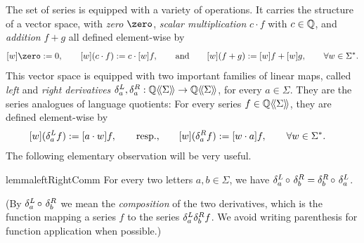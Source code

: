 The set of series is equipped with a variety of operations.
%
It carries the structure of a vector space,
with \emph{zero} $\zero$,
\emph{scalar multiplication} $c \cdot f$ with $c \in \mathbb Q$,
and \emph{addition} $f + g$ all defined element-wise by
%
\begin{align*}
    \coefficient w \zero := 0, \qquad
    \coefficient w {(c \cdot f)} := c \cdot \coefficient w f, \qquad \text{and} \qquad
    \coefficient w {(f + g)} := \coefficient w f + \coefficient w g,
    \qquad \forall w \in \Sigma^*.
\end{align*}
%
This vector space is equipped with two important families of linear maps,
called \emph{left} and \emph{right derivatives}
$\delta^L_{a}, \delta^R_{a} : \mathbb Q\langle\!\langle\Sigma\rangle\!\rangle \to \mathbb Q\langle\!\langle\Sigma\rangle\!\rangle$,
for every $a \in \Sigma$.
%
They are the series analogues of language quotients:
%
For every series $f \in \mathbb Q\langle\!\langle\Sigma\rangle\!\rangle$,
they are defined element-wise by
%
\begin{align*}
    [w](\delta^L_{a} f)
        &:= [a \cdot w]f,
    \qquad\text{resp.,}\qquad
    [w](\delta^R_{a} f)
        := [w \cdot a]f,
    \qquad \forall w \in \Sigma^*.
\end{align*}
%
The following elementary observation will be very useful.
%
\begin{restatable}{lemma}{leftRightComm}
    \label{lem:derive left right commutativity}
    For every two letters $a, b \in \Sigma$,
    we have $\deriveleft a \circ \deriveright b = \deriveright b \circ \deriveleft a$.
\end{restatable}
\noindent
(By $\deriveleft a \circ \deriveright b$ we mean the \emph{composition} of the two derivatives,
which is the function mapping a series $f$ to the series $\delta^L_{a} \delta^R_{b} f$.
We avoid writing parenthesis for function application when possible.)
%
